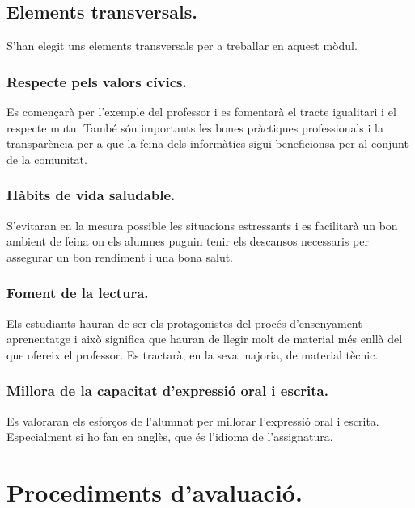 \documentclass[catalan, a4paper, 12pt, titlepage]{article}
\begin{document}
\subsection{Elements transversals.}

S'han elegit uns elements transversals per a treballar en aquest mòdul.

\subsubsection{Respecte pels valors cívics.}

Es començarà per l'exemple del professor i es fomentarà el tracte igualitari i el respecte mutu. També són importants les bones pràctiques professionals i la transparència per a que la feina dels informàtics sigui beneficionsa per al conjunt de la comunitat.

\subsubsection{Hàbits de vida saludable.}

S'evitaran en la mesura possible les situacions estressants i es facilitarà un bon ambient de feina on els alumnes puguin tenir els descansos necessaris per assegurar un bon rendiment i una bona salut.

\subsubsection{Foment de la lectura.}

Els estudiants hauran de ser els protagonistes del procés d'ensenyament aprenentatge i això significa que hauran de llegir molt de material més enllà del que ofereix el professor. Es tractarà, en la seva majoria, de material tècnic.

\subsubsection{Millora de la capacitat d'expressió oral i escrita.}

Es valoraran els esforços de l'alumnat per millorar l'expressió oral i escrita. Especialment si ho fan en anglès, que és l'idioma de l'assignatura.

\section{Procediments d'avaluació.}
\label{sec:procediments}
\end{document}
